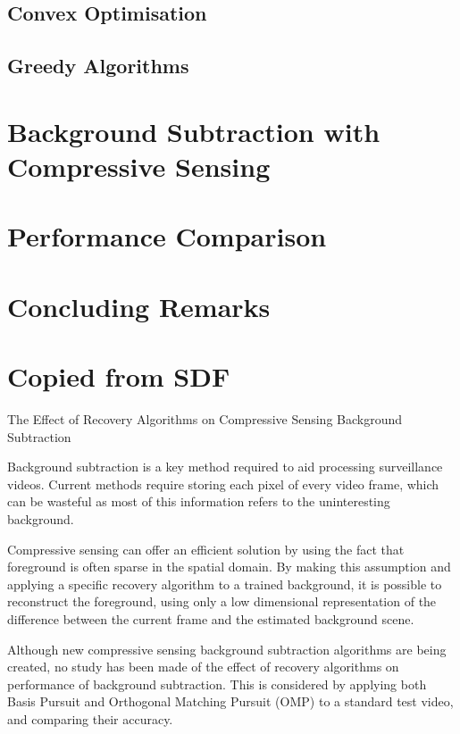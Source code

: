 \subsection{Convex Optimisation}
\label{sec:convex}

\subsection{Greedy Algorithms}
\label{sec:ga}

\section{Background Subtraction with Compressive Sensing}
\label{sec:bscs}

\section{Performance Comparison}
\label{sec:perf}

\section{Concluding Remarks}
\label{sec:4conc}


\section{Copied from SDF}

The Effect of Recovery Algorithms on Compressive Sensing Background Subtraction

Background subtraction is a key method required to aid processing surveillance videos. Current methods require storing each pixel of every video frame, which can be wasteful as most of this information refers to the uninteresting background. 

Compressive sensing can offer an efficient solution by using the fact that foreground is often sparse in the spatial domain. By making this assumption and applying a specific recovery algorithm to a trained background, it is possible to reconstruct the foreground, using only a low dimensional representation of the difference between the current frame and the estimated background scene. 

Although new compressive sensing background subtraction algorithms are being created, no study has been made of the effect of recovery algorithms on performance of background subtraction. This is considered by applying both Basis Pursuit and Orthogonal Matching Pursuit (OMP) to a standard test video, and comparing their accuracy. 

